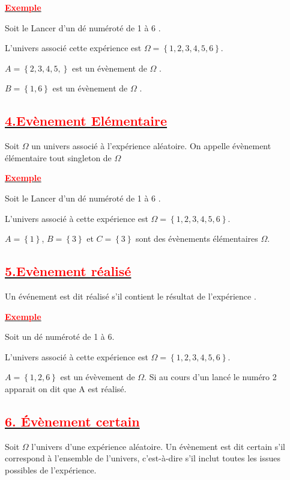 \documentclass[12pt]{article}
\begin{document}
\underline{\textbf{\textcolor{red}{Exemple}}}

Soit le Lancer d’un dé numéroté de 1 à 6 .


L’univers associé cette expérience est $\Omega=\left\lbrace 1, 2, 3, 4, 5, 6\right\rbrace$.

$A=\left\lbrace 2, 3, 4, 5,\right\rbrace$ est un évènement de $\Omega$ .

$B=\left\lbrace 1, 6\right\rbrace$ est un évènement de $\Omega$ .

\subsection*{\underline{\textbf{\textcolor{red}{4.Evènement Elémentaire}}}}
Soit $\Omega$ un univers associé à l'expérience aléatoire. On appelle évènement élémentaire tout singleton de $\Omega$

\underline{\textbf{\textcolor{red}{Exemple}}}

Soit le Lancer d’un dé numéroté de 1 à 6 .

L’univers associé à cette expérience est $\Omega=\left\lbrace 1, 2, 3, 4, 5, 6\right\rbrace$.

$A=\left\lbrace 1 \right\rbrace $, $B=\left\lbrace 3 \right\rbrace $ et $C=\left\lbrace 3 \right\rbrace $ sont des évènements élémentaires $\Omega$.

\subsection*{\underline{\textbf{\textcolor{red}{5.Evènement réalisé}}}}
Un événement est dit réalisé s’il contient le résultat de l’expérience .

\underline{\textbf{\textcolor{red}{Exemple}}}

Soit un dé numéroté de 1 à 6.

L’univers associé à cette expérience est $\Omega = \left\lbrace 1, 2, 3, 4, 5, 6 \right\rbrace $.

$A = \left\lbrace 1, 2, 6 \right\rbrace $ est un évèvement de $\Omega$.
Si au cours d'un lancé le numéro 2 apparait on dit que A est réalisé.

\subsection*{\underline{\textbf{\textcolor{red}{6. Évènement certain}}}}
Soit $\Omega$ l'univers d'une expérience aléatoire. Un évènement est dit certain s'il correspond à l'ensemble de l'univers, c'est-à-dire s'il inclut toutes les issues possibles de l'expérience.
\end{document}

